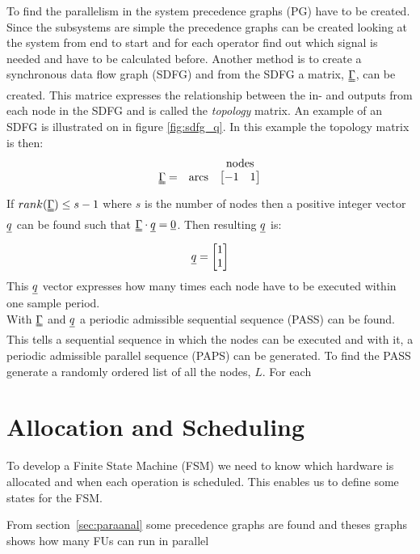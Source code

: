 To find the parallelism in the system precedence graphs (PG) have to be created. Since the subsystems are simple the precedence graphs can be created looking at the system from end to start and for each operator find out which signal is needed and have to be calculated before. Another method is to create a synchronous data flow graph (SDFG) and from the SDFG a matrix, $\uuline\Gamma$, can be created. This matrice expresses the relationship between the in- and outputs from each node in the SDFG and is called the \textit{topology} matrix. An example of an SDFG is illustrated on in figure \ref{fig:sdfg_q}. In this example the topology matrix is then:
\begin{equation}
  \begin{array}{ c c c }
    & & \text{nodes} \\
  \uuline\Gamma = & \text{arcs} & 
  \begin{bmatrix}
   -1 & 1 
  \end{bmatrix}
  \end{array}
\end{equation}
If $rank(\uuline \Gamma) \leq s-1$ where $s$ is the number of nodes then a positive integer vector $\uline q$ can be found such that $\uuline\Gamma \cdot \uline q = \uline 0$. Then resulting $\uline q$ is:
\begin{equation}
  \uline{q} =
  \begin{bmatrix}
  1 \\
  1
  \end{bmatrix}
\end{equation}
This $\uline q$ vector expresses how many times each node have to be executed within one sample period.\\

With $\uuline \Gamma$ and $\uline q$ a periodic admissible sequential sequence (PASS) can be found. This tells a sequential sequence in which the nodes can be executed and with it, a periodic admissible parallel sequence (PAPS) can be generated. To find the PASS generate a randomly ordered list of all the nodes, $L$. For each 

\section{Allocation and Scheduling}
To develop a Finite State Machine (FSM) we need to know which hardware is allocated and when each operation is scheduled. This enables us to define some states for the FSM.

From section~\vref{sec:paraanal} some precedence graphs are found and theses graphs shows how many FUs can run in parallel 

